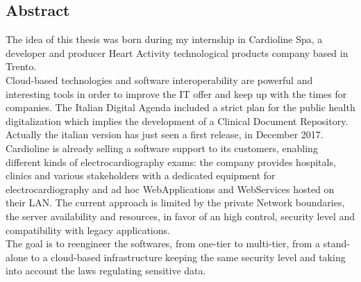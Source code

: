 \thispagestyle{empty}
\begin{center}
    {\chapter*{Abstract}} %
\end{center}
\label{abstract}

The idea of this thesis was born during my internship in Cardioline Spa, a developer and producer Heart Activity technological products company based in Trento.\\Cloud-based technologies and software interoperability are powerful and interesting tools in order to improve the IT offer and keep up with the times for companies. The Italian Digital Agenda included a strict plan for the public health digitalization which implies the development of a Clinical Document Repository. Actually the italian version has just seen a first release, in December 2017.\\Cardioline is already selling a software support to its customers, enabling different kinds of electrocardiography exams: the company provides hospitals, clinics and various stakeholders with a dedicated equipment for electrocardiography and ad hoc WebApplications and WebServices hosted on their LAN. The current approach is limited by the private Network boundaries, the server availability and resources, in favor of an high control, security level and compatibility with legacy applications.\\The goal is to reengineer the softwares, from one-tier to multi-tier, from a stand-alone to a cloud-based infrastructure keeping the same security level and taking into account the laws regulating sensitive data.\\
